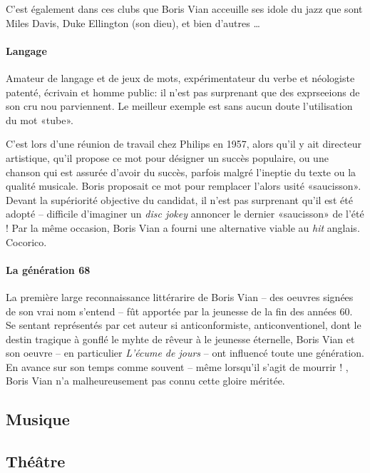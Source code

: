 C'est également dans ces clubs que Boris Vian acceuille ses idole du jazz que sont
Miles Davis, Duke Ellington (son dieu), et bien d'autres \ldots

\paragraph{Langage}

Amateur de langage et de jeux de mots, expérimentateur du verbe et néologiste
patenté, écrivain et homme public: il n'est pas surprenant que des exprseeions
de son cru nou parviennent.
Le meilleur exemple est sans aucun doute l'utilisation du mot «tube».

C'est lors d'une réunion de travail chez Philips en 1957, alors qu'il y ait
directeur artistique, qu'il propose ce mot pour désigner un succès populaire,
ou une chanson qui est assurée d'avoir du succès, parfois malgré l'ineptie du
texte ou la qualité musicale. Boris proposait ce mot pour remplacer l'alors
usité «saucisson». Devant la supériorité objective du candidat, il n'est pas
surprenant qu'il est été adopté -- difficile d'imaginer un \emph{disc jokey}
annoncer le dernier «saucisson» de l'été ! Par la même occasion, Boris Vian a
fourni une alternative viable au \emph{hit} anglais. Cocorico.

\paragraph{La génération 68}

La première large reconnaissance littérarire de Boris Vian -- des oeuvres signées
de son vrai nom s'entend -- fût apportée par la jeunesse de la fin des années 60.
Se sentant représentés par cet auteur si anticonformiste, anticonventionel, dont
le destin tragique à gonflé le myhte de rêveur à le jeunesse éternelle, Boris Vian
et son oeuvre -- en particulier \emph{L'écume de jours} -- ont influencé toute une
génération. En avance sur son temps comme souvent -- même lorsqu'il s'agit de
mourrir ! , Boris Vian n'a malheureusement pas connu cette gloire méritée.

\subsection{Musique}

\subsection{Théâtre}


